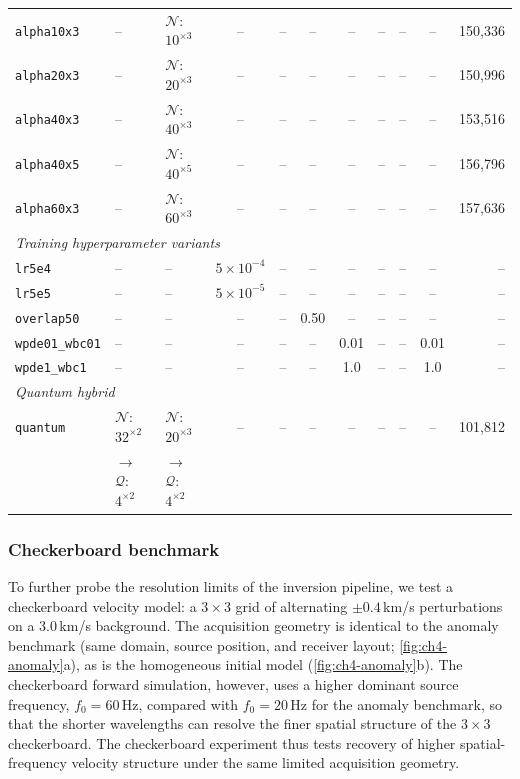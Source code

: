 \begin{table}[!t]
{\begin{tabular}{l l l c c c c c c c r}
\texttt{alpha10x3} & -- & $\mathcal{N}$: $10^{\times3}$ & -- & -- & -- & -- & -- & -- & -- & 150{,}336 \\
\texttt{alpha20x3} & -- & $\mathcal{N}$: $20^{\times3}$ & -- & -- & -- & -- & -- & -- & -- & 150{,}996 \\
\texttt{alpha40x3} & -- & $\mathcal{N}$: $40^{\times3}$ & -- & -- & -- & -- & -- & -- & -- & 153{,}516 \\
\texttt{alpha40x5} & -- & $\mathcal{N}$: $40^{\times5}$ & -- & -- & -- & -- & -- & -- & -- & 156{,}796 \\
\texttt{alpha60x3} & -- & $\mathcal{N}$: $60^{\times3}$ & -- & -- & -- & -- & -- & -- & -- & 157{,}636 \\
\midrule
\multicolumn{11}{l}{\emph{Training hyperparameter variants}} \\
\texttt{lr5e4} & -- & -- & $5\!\times\!10^{-4}$ & -- & -- & -- & -- & -- & -- & -- \\
\texttt{lr5e5} & -- & -- & $5\!\times\!10^{-5}$ & -- & -- & -- & -- & -- & -- & -- \\
\texttt{overlap50} & -- & -- & -- & -- & 0.50 & -- & -- & -- & -- & -- \\
\texttt{wpde01\_wbc01} & -- & -- & -- & -- & -- & 0.01 & -- & -- & 0.01 & -- \\
\texttt{wpde1\_wbc1} & -- & -- & -- & -- & -- & 1.0 & -- & -- & 1.0 & -- \\
\midrule
\multicolumn{11}{l}{\emph{Quantum hybrid}} \\
\texttt{quantum} & $\mathcal{N}$: $32^{\times2}$ & $\mathcal{N}$: $20^{\times3}$ & -- & -- & -- & -- & -- & -- & -- & 101{,}812 \\
 & $\to$ $\mathcal{Q}$: $4^{\times2}$ & $\to$ $\mathcal{Q}$: $4^{\times2}$ & & & & & & & & \\
\bottomrule
\end{tabular}%
}
\end{table}

\subsubsection{Checkerboard benchmark}
\label{sec:ch4-results-checkerboard}

To further probe the resolution limits of the inversion pipeline, we test a checkerboard velocity model: a $3\times 3$ grid of alternating $\pm$$0.4$\,km/s perturbations on a $3.0$\,km/s background. The acquisition geometry is identical to the anomaly benchmark (same domain, source position, and receiver layout; \ref{fig:ch4-anomaly}a), as is the homogeneous initial model (\ref{fig:ch4-anomaly}b). The checkerboard forward simulation, however, uses a higher dominant source frequency, $f_0 = 60$\,Hz, compared with $f_0 = 20$\,Hz for the anomaly benchmark, so that the shorter wavelengths can resolve the finer spatial structure of the $3\times 3$ checkerboard. The checkerboard experiment thus tests recovery of higher spatial-frequency velocity structure under the same limited acquisition geometry.

